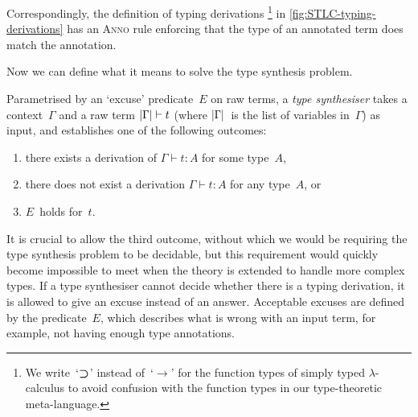 Correspondingly, the definition of typing derivations%
\footnote{We write~`$\mathbin{\bm{\supset}}$' instead of~`$\to$' for the function types of simply typed $\lambda$-calculus to avoid confusion with the function types in our type-theoretic meta-language.}
in \cref{fig:STLC-typing-derivations} has an \textsc{Anno} rule enforcing that the type of an annotated term does match the annotation.

Now we can define what it means to solve the type synthesis problem.

\begin{defn}
\label{def:STLC-type-synthesiser}
Parametrised by an `excuse' predicate~$E$ on raw terms, a \emph{type synthesiser} takes a context~$\Gamma$ and a raw term $\left|\Gamma\right| \vdash t$ (where $\left|\Gamma\right|$~is the list of variables in~$\Gamma$) as input, and establishes one of the following outcomes:
\begin{enumerate}
\item there exists a derivation of $\Gamma \vdash t : A$ for some type~$A$,
\item there does not exist a derivation $\Gamma \vdash t : A$ for any type~$A$, or
\item $E$~holds for~$t$.
\end{enumerate}
\end{defn}

It is crucial to allow the third outcome, without which we would be requiring the type synthesis problem to be decidable, but this requirement would quickly become impossible to meet when the theory is extended to handle more complex types.
If a type synthesiser cannot decide whether there is a typing derivation, it is allowed to give an excuse instead of an answer.
Acceptable excuses are defined by the predicate~$E$, which describes what is wrong with an input term, for example, not having enough type annotations.


